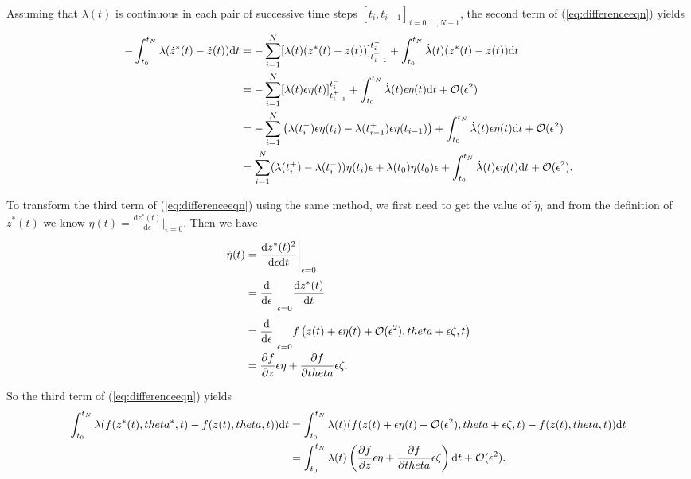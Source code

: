 \documentclass[a4paper,11pt,titlepage]{article}
\theoremstyle{definition}
\theoremstyle{plain}
\theoremstyle{remark}
\begin{document}
Assuming that $\lambda(t)$ is continuous in each pair of successive time steps $[t_i,t_{i+1}]_{i=0,\dots,N-1}$, the second term of (\ref{eq:differenceeqn}) yields 
\begin{align}
-\int^{t_N}_{t_0}\lambda(\dot{z}^*(t)-\dot{z}(t))\mathrm{d}t&=-\sum^{N}_{i=1}[\lambda(t)(z^*(t)-z(t))]_{t_{i-1}^+}^{t_{i}^-}+\int^{t_N}_{t_0}\dot{\lambda}(t)(z^*(t)-z(t))\mathrm{d}t\notag\\
&=-\sum^{N}_{i=1}[\lambda(t)\epsilon\eta(t)]_{t_{i-1}^+}^{t_{i}^-}+\int^{t_N}_{t_0}\dot{\lambda}(t)\epsilon\eta(t)\mathrm{d}t+\mathcal{O}(\epsilon^2)\notag\\
&=-\sum^{N}_{i=1}\left(\lambda(t_i^-)\epsilon\eta(t_i)-\lambda(t_{i-1}^+)\epsilon\eta(t_{i-1})\right)+\int^{t_N}_{t_0}\dot{\lambda}(t)\epsilon\eta(t)\mathrm{d}t+\mathcal{O}(\epsilon^2)\notag\\
&=\sum^{N}_{i=1} (\lambda(t_i^+)-\lambda(t_i^-))\eta(t_i)\epsilon+\lambda(t_0)\eta(t_0)\epsilon+\int^{t_N}_{t_0}\dot{\lambda}(t)\epsilon\eta(t)\mathrm{d}t+\mathcal{O}(\epsilon^2).\notag
\end{align}

To transform the third term of (\ref{eq:differenceeqn}) using the same method, we first need to get the value of $\dot{\eta}$, and from the definition of $z^*(t)$ we know $\eta(t)=\frac{\mathrm{d}z^*(t)}{\mathrm{d}\epsilon}\big\rvert_{\epsilon=0}$. Then we have
\begin{align}
\dot{\eta}(t)&=\frac{\mathrm{d}z^*(t)^2}{\mathrm{d}\epsilon\mathrm{d}t}\Bigg\rvert_{\epsilon=0}\notag\\
&=\frac{\mathrm{d}}{\mathrm{d}\epsilon}\Bigg\rvert_{\epsilon=0}\frac{\mathrm{d}z^*(t)}{\mathrm{d}t}\notag\\
&=\frac{\mathrm{d}}{\mathrm{d}\epsilon}\Bigg\rvert_{\epsilon=0}f\left(z(t)+\epsilon\eta(t)+\mathcal{O}(\epsilon^2),\theta+\epsilon\zeta,t\right)\notag\\
&=\frac{\partial f}{\partial z}\epsilon\eta+\frac{\partial f}{\partial \theta}\epsilon\zeta.\notag\end{align}

So the third term of (\ref{eq:differenceeqn}) yields
\begin{align}
\int^{t_N}_{t_0}\lambda(f(z^*(t),\theta^*,t)-f(z(t),\theta,t))\mathrm{d}t&=\int^{t_N}_{t_0}\lambda(t)(f(z(t)+\epsilon\eta(t)+\mathcal{O}(\epsilon^2),\theta+\epsilon\zeta,t)-f(z(t),\theta,t))\mathrm{d}t\notag\\
&=\int^{t_N}_{t_0}\lambda(t)\left(\frac{\partial f}{\partial z}\epsilon\eta+\frac{\partial f}{\partial \theta}\epsilon\zeta\right)\mathrm{d}t+\mathcal{O}(\epsilon^2).\notag
\end{align}
\end{document}
